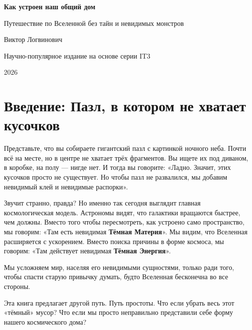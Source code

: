 \documentclass[12pt,a4paper,oneside]{book}
\begin{document}
\begin{titlepage}
    \centering
    \vspace*{2cm}
    {\Huge\bfseries Как устроен наш общий дом\par}
    \vspace{0.5cm}
    {\Large Путешествие по Вселенной без тайн и невидимых монстров\par}
    \vspace{2cm}
    {\Large Виктор Логвинович\par}
    \vfill
    {\large Научно-популярное издание на основе серии IT3\par}
    \vspace{1cm}
    {2026\par}
\end{titlepage}

\frontmatter
\tableofcontents

\chapter*{Введение: Пазл, в котором не хватает кусочков}

Представьте, что вы собираете гигантский пазл с картинкой ночного неба. Почти всё на месте, но в центре не хватает трёх фрагментов. Вы ищете их под диваном, в коробке, на полу — нигде нет. И тогда вы говорите: «Ладно. Значит, этих кусочков просто не существует. Но чтобы пазл не развалился, мы добавим невидимый клей и невидимые распорки».

Звучит странно, правда? Но именно так сегодня выглядит главная космологическая модель. Астрономы видят, что галактики вращаются быстрее, чем должны. Вместо того чтобы пересмотреть, как устроено само пространство, мы говорим: «Там есть невидимая \textbf{Тёмная Материя}». Мы видим, что Вселенная расширяется с ускорением. Вместо поиска причины в форме космоса, мы говорим: «Там действует невидимая \textbf{Тёмная Энергия}».

Мы усложняем мир, населяя его невидимыми сущностями, только ради того, чтобы спасти старую привычку думать, будто Вселенная бесконечна во все стороны.

Эта книга предлагает другой путь. Путь простоты.
Что если убрать весь этот «тёмный» мусор? Что если мы просто неправильно представили себе форму нашего космического дома?
\end{document}

